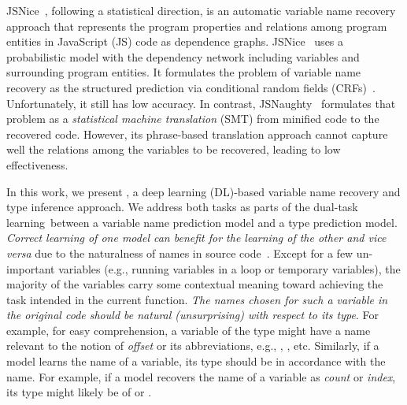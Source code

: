 JSNice~\cite{JSNice2015}, following a statistical direction, is an
automatic variable name recovery approach that represents the program
properties and relations among program entities in JavaScript (JS)
code as dependence graphs. JSNice~\cite{JSNice2015} uses a
probabilistic model with the dependency network including
variables and surrounding program entities. It formulates the problem
of variable name recovery as the structured prediction via conditional
random fields (CRFs)~\cite{JSNice2015}. Unfortunately, it still has
low accuracy.
%
In contrast, JSNaughty~\cite{JSNaughty2017} formulates
that problem as a {\em statistical machine translation} (SMT) from
minified code to the recovered code. However, its
phrase-based translation approach cannot capture well the relations
among the variables to be recovered, leading to low
effectiveness.




In this work, we present {\tool}, a deep learning (DL)-based variable
name recovery and type inference approach.
We address both tasks as parts of the dual-task learning~between a variable
name prediction model and a type prediction model. {\em Correct
  learning of one model can benefit for the learning of the other and
  vice versa} due to the naturalness of names in source
code~\cite{hindle-icse12}.
%
Except for a few un-important variables (e.g., running variables in a
loop or temporary variables), the majority of the variables carry some
contextual meaning toward achieving the task intended in the current
function.
%
{\em The names chosen for such a variable in the original code should
  be natural (unsurprising) with respect to its type}.
For example, for easy comprehension, a variable of the type
 might have a name relevant to the notion of {\em offset}
or its abbreviations, e.g., , , etc.
Similarly, if a model learns the name of a variable, its type should
be in accordance with the name. For example, if a model recovers the
name of a variable as {\em count} or {\em index}, its type might
likely be of  or .

